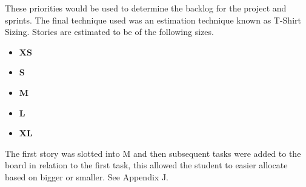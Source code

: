 These priorities would be used to determine the backlog for the project and sprints.
\newline
The final technique used was an estimation technique known as T-Shirt Sizing. Stories are estimated to be of the following sizes.
\begin{itemize}
    \item \textbf{XS}
    \item \textbf{S}
    \item \textbf{M}
    \item \textbf{L}
    \item \textbf{XL}
\end{itemize}
The first story was slotted into M and then subsequent tasks were 
added to the board in relation to the first task, this allowed the student to easier allocate based on bigger or smaller. See Appendix J.

